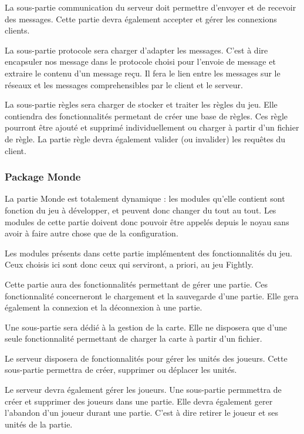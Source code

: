 \documentclass[a4paper,10pt]{report}
\begin{document}
	La sous-partie communication du serveur doit permettre d'envoyer et de recevoir des messages. Cette partie devra également accepter et gérer les connexions clients.

	La sous-partie protocole sera charger d'adapter les messages. C'est à dire encapsuler nos message dans le protocole choisi pour l'envoie de message et extraire le contenu d'un message reçu. Il fera le lien entre les messages sur le réseaux et les messages comprehensibles par le client et le serveur.

	La sous-partie règles sera charger de stocker et traiter les règles du jeu. Elle contiendra des fonctionnalités permetant de créer une base de règles. Ces règle pourront être ajouté et supprimé individuellement ou charger à partir d'un fichier de règle. La partie règle devra également valider (ou invalider) les requêtes du client.

      \subsubsection{Package Monde}

	La partie Monde est totalement dynamique : les modules qu'elle contient sont fonction du jeu à développer, et peuvent donc changer du tout au tout. Les modules de cette partie doivent donc pouvoir être appelés depuis le noyau sans avoir à faire autre chose que de la configuration. 

	Les modules présents dans cette partie implémentent des fonctionnalités du jeu. Ceux choisis ici sont donc ceux qui serviront, a priori, au jeu Fightly.

	Cette partie aura des fonctionnalités permettant de gérer une partie. Ces fonctionnalité concerneront le chargement et la sauvegarde d'une partie. Elle gera également la connexion et la déconnexion à une partie.

	Une sous-partie sera dédié à la gestion de la carte. Elle ne disposera que d'une seule fonctionnalité permettant de charger la carte à partir d'un fichier.

	Le serveur disposera de fonctionnalités pour gérer les unités des joueurs. Cette sous-partie permettra de créer, supprimer ou déplacer les unités.

	Le serveur devra également gérer les joueurs. Une sous-partie permmettra de créer et supprimer des joueurs dans une partie. Elle devra également gerer l'abandon d'un joueur durant une partie. C'est à dire retirer le joueur et ses unités de la partie.
\end{document}
